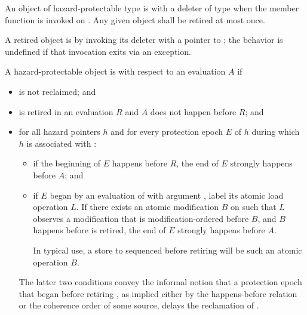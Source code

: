 \pnum
An object  of hazard-protectable type  is
 with a deleter of type 
when the member function 
is invoked on .
Any given object  shall be retired at most once.

\pnum
A retired object  is 
by invoking its deleter with a pointer to ;
the behavior is undefined if that invocation exits via an exception.

\pnum
A hazard-protectable object  is 
with respect to an evaluation $A$ if
\begin{itemize}
\item
{} is not reclaimed; and
\item
{} is retired in an evaluation $R$ and
$A$ does not happen before $R$; and
\item
for all hazard pointers $h$ and for every protection epoch $E$ of $h$
during which $h$ is associated with :
\begin{itemize}
\item
if the beginning of $E$ happens before $R$,
the end of $E$ strongly happens before $A$; and
\item
if $E$ began by an evaluation of  with argument ,
label its atomic load operation $L$.
If there exists an atomic modification $B$ on 
such that $L$ observes a modification that is modification-ordered before $B$, and
$B$ happens before  is retired,
the end of $E$ strongly happens before $A$.
\begin{note}
In typical use, a store to  sequenced before retiring 
will be such an atomic operation $B$.
\end{note}
\end{itemize}
\begin{note}
The latter two conditions convey the informal notion
that a protection epoch that began before retiring ,
as implied either by the happens-before relation or
the coherence order of some source,
delays the reclamation of .
\end{note}
\end{itemize}

